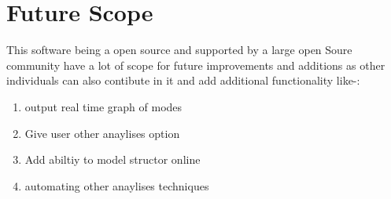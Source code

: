 \section{Future Scope}
This software being a open source and supported by a large open Soure community have a lot of scope for future improvements
and additions as other individuals can also contibute in it and add additional functionality 
like-:
\begin{enumerate}
\item output real time graph of modes 
\item Give user other anaylises option 
\item Add abiltiy to model structor online
\item automating other anaylises techniques
\end{enumerate} 
